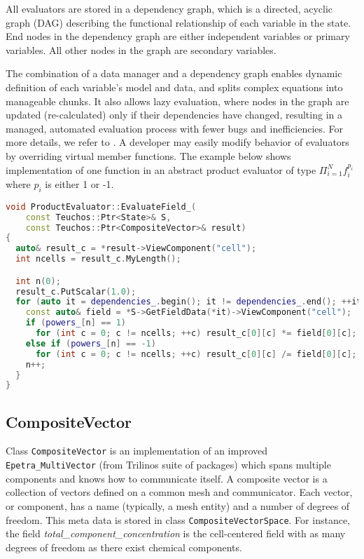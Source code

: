 All evaluators are stored in a dependency graph, which is a directed, acyclic graph (DAG) 
describing the functional relationship of each variable in the state. 
End nodes in the dependency graph are either independent variables or primary variables. 
All other nodes in the graph are secondary variables.

The combination of a data manager and a dependency graph enables dynamic definition of each variable's model 
and data, and splits complex equations into manageable chunks. 
It also allows lazy evaluation, where nodes in the graph are updated (re-calculated) only if their dependencies
have changed, resulting in a managed, automated evaluation process with fewer bugs and inefficiencies.
For more details, we refer to \cite{coon2016managing}.
A developer may easily modify behavior of evaluators by overriding virtual member functions. 
The example below shows implementation of one function in an abstract product evaluator of type 
$\Pi_{i=1}^N f_i^{p_i}$ where $p_i$ is either 1 or -1.

\begin{lstlisting}[language=C++]
void ProductEvaluator::EvaluateField_(
    const Teuchos::Ptr<State>& S,
    const Teuchos::Ptr<CompositeVector>& result)
{
  auto& result_c = *result->ViewComponent("cell");
  int ncells = result_c.MyLength();

  int n(0);
  result_c.PutScalar(1.0);
  for (auto it = dependencies_.begin(); it != dependencies_.end(); ++it) {
    const auto& field = *S->GetFieldData(*it)->ViewComponent("cell");
    if (powers_[n] == 1)
      for (int c = 0; c != ncells; ++c) result_c[0][c] *= field[0][c];
    else if (powers_[n] == -1)
      for (int c = 0; c != ncells; ++c) result_c[0][c] /= field[0][c];
    n++;
  }
}
\end{lstlisting}



\subsection{CompositeVector}
Class {\tt CompositeVector} is an implementation of an improved
{\tt Epetra\_MultiVector} (from Trilinos suite of packages) which spans multiple components and knows how to
communicate itself.
A composite vector is a collection of vectors defined on a common mesh and
communicator. 
Each vector, or component, has a name (typically, a mesh entity)
and a number of degrees of freedom.  
This meta data is stored in class {\tt CompositeVectorSpace}.
For instance, the field {\it total\_component\_concentration} is the cell-centered field with 
as many degrees of freedom as there exist chemical components.

